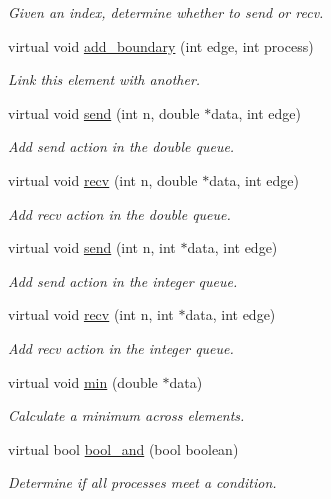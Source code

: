 \begin{DoxyCompactItemize}
\begin{DoxyCompactList}\small\item\em Given an index, determine whether to send or recv. \end{DoxyCompactList}\item 
virtual void \hyperlink{classbases_1_1messenger_a64687bc91d7e8c818951eb311ec59bb8}{add\-\_\-boundary} (int edge, int process)
\begin{DoxyCompactList}\small\item\em Link this element with another. \end{DoxyCompactList}\item 
virtual void \hyperlink{classbases_1_1messenger_ad0d6143a787a00261784493ec7413a17}{send} (int n, double $\ast$data, int edge)
\begin{DoxyCompactList}\small\item\em Add send action in the double queue. \end{DoxyCompactList}\item 
virtual void \hyperlink{classbases_1_1messenger_a5d43e922b30cbe13f76f3ff46511601b}{recv} (int n, double $\ast$data, int edge)
\begin{DoxyCompactList}\small\item\em Add recv action in the double queue. \end{DoxyCompactList}\item 
virtual void \hyperlink{classbases_1_1messenger_a7a0b0da172ae2a53693e330daf945acf}{send} (int n, int $\ast$data, int edge)
\begin{DoxyCompactList}\small\item\em Add send action in the integer queue. \end{DoxyCompactList}\item 
virtual void \hyperlink{classbases_1_1messenger_ae59f0a20772afbb06c836310b3a3f452}{recv} (int n, int $\ast$data, int edge)
\begin{DoxyCompactList}\small\item\em Add recv action in the integer queue. \end{DoxyCompactList}\item 
virtual void \hyperlink{classbases_1_1messenger_a7d14d988ce500b9c56a34b44b6e6ca94}{min} (double $\ast$data)
\begin{DoxyCompactList}\small\item\em Calculate a minimum across elements. \end{DoxyCompactList}\item 
virtual bool \hyperlink{classbases_1_1messenger_a9f711b71b09ca9940a7363c821307c93}{bool\-\_\-and} (bool boolean)
\begin{DoxyCompactList}\small\item\em Determine if all processes meet a condition. \end{DoxyCompactList}\end{DoxyCompactItemize}


